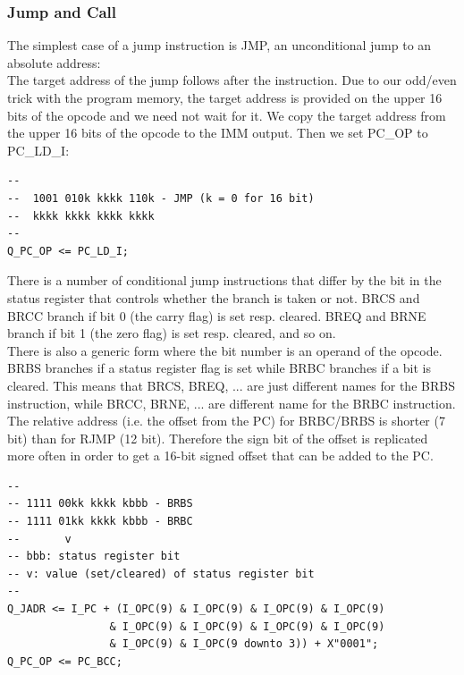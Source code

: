 \documentclass[12pt,a4paper]{report}
\begin{document}
\subsubsection{Jump and Call}
The simplest case of a jump instruction is JMP, an unconditional jump to an absolute address:\\
The target address of the jump follows after the instruction. Due to our odd/even trick with the program memory, the target address is provided on the upper 16 bits of the opcode and we need not wait for it. We copy the target address from the upper 16 bits of the opcode to the IMM output. Then we set PC\_OP to PC\_LD\_I:\\
\begin{lstlisting}
--
--  1001 010k kkkk 110k - JMP (k = 0 for 16 bit)
--  kkkk kkkk kkkk kkkk
--
Q_PC_OP <= PC_LD_I;
\end{lstlisting}
There is a number of conditional jump instructions that differ by the bit in the status register that controls whether the branch is taken or not. BRCS and BRCC branch if bit 0 (the carry flag) is set resp. cleared. BREQ and BRNE branch if bit 1 (the zero flag) is set resp. cleared, and so on. \\
There is also a generic form where the bit number is an operand of the opcode. BRBS branches if a status register flag is set while BRBC branches if a bit is cleared. This means that BRCS, BREQ, ... are just different names for the BRBS instruction, while BRCC, BRNE, ... are different name for the BRBC instruction.\\
The relative address (i.e. the offset from the PC) for BRBC/BRBS is shorter (7 bit) than for RJMP (12 bit). Therefore the sign bit of the offset is replicated more often in order to get a 16-bit signed offset that can be added to the PC.\\
\begin{lstlisting}
--
-- 1111 00kk kkkk kbbb - BRBS
-- 1111 01kk kkkk kbbb - BRBC
--       v
-- bbb: status register bit
-- v: value (set/cleared) of status register bit
--
Q_JADR <= I_PC + (I_OPC(9) & I_OPC(9) & I_OPC(9) & I_OPC(9)
                & I_OPC(9) & I_OPC(9) & I_OPC(9) & I_OPC(9)
                & I_OPC(9) & I_OPC(9 downto 3)) + X"0001";
Q_PC_OP <= PC_BCC;
\end{lstlisting}
\end{document}
